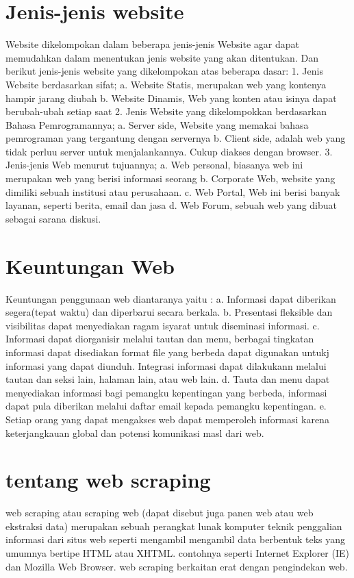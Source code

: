 \documentclass[12pt, a4paper]{article}
\begin{document}
\section{Jenis-jenis website}
Website dikelompokan dalam beberapa jenis-jenis Website agar dapat memudahkan dalam menentukan jenis website
yang akan ditentukan. Dan berikut jenis-jenis website yang dikelompokan atas beberapa dasar:
1. Jenis Website berdasarkan sifat;
	a. Website Statis, merupakan web yang kontenya hampir jarang diubah
	b. Website Dinamis, Web yang konten atau isinya dapat berubah-ubah setiap saat
2. Jenis Website yang dikelompokkan berdasarkan Bahasa Pemrogramannya;
	a. Server side, Website yang memakai bahasa pemrograman yang tergantung
		dengan servernya
	b. Client side, adalah web yang tidak perluu server untuk menjalankannya.
	   Cukup diakses dengan browser.
3. Jenis-jenis Web menurut tujuannya;
	a. Web personal, biasanya web ini merupakan web yang berisi informasi
	   seorang
	b. Corporate Web, website yang dimiliki sebuah institusi atau
	   perusahaan.
	c. Web Portal, Web ini berisi banyak layanan, seperti berita, email dan jasa
	d. Web Forum, sebuah web yang dibuat sebagai sarana diskusi.
	
\section{Keuntungan Web}
Keuntungan penggunaan web diantaranya yaitu :
a. Informasi dapat diberikan segera(tepat waktu) dan diperbarui secara berkala.
b. Presentasi fleksible dan visibilitas dapat menyediakan ragam isyarat untuk diseminasi informasi.
c. Informasi dapat diorganisir melalui tautan dan menu, berbagai tingkatan informasi dapat disediakan format
file yang berbeda dapat digunakan untukj informasi yang dapat diunduh. Integrasi informasi dapat dilakukann
melalui tautan dan seksi lain, halaman lain, atau web lain.
d. Tauta  dan menu dapat menyediakan informasi bagi pemangku kepentingan yang berbeda, informasi dapat pula
diberikan melalui daftar email kepada pemangku kepentingan.
e. Setiap orang yang dapat mengakses web dapat memperoleh informasi karena keterjangkauan global dan potensi
komunikasi masl dari web.
	   
\section{tentang web scraping}
web scraping atau scraping web (dapat disebut juga panen web atau web ekstraksi data) merupakan sebuah
perangkat lunak komputer teknik penggalian informasi dari situs web seperti mengambil mengambil data
berbentuk teks yang umumnya bertipe HTML atau XHTML. contohnya seperti Internet Explorer (IE) dan Mozilla Web
Browser. web scraping berkaitan erat dengan pengindekan web.
\end{document}
